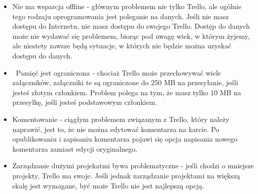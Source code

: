 \documentclass[12pt]{article}
\renewcommand{\_}{\kern-1.5pt\textunderscore\kern-1.5pt}
\begin{document}
\begin{itemize}
	\item Nie ma wsparcja offline - głównym problemem nie tylko Trello, ale ogólnie tego rodzaju oprogramowania jest poleganie na danych. Jeśli nie masz dostępu do Internetu, nie masz dostępu do swojego Trello. Dostęp do danych może nie wydawać się problemem, biorąc pod uwagę wiek, w którym żyjemy, ale niestety zawsze będą sytuacje, w których nie będzie można uzyskać dostępu do danych.\par

	\item  Pamięć jest ograniczona - chociaż Trello może przechowywać wiele załączników, załączniki te są ograniczone do 250 MB na przesyłanie, jeśli jesteś złotym członkiem. Problem polega na tym, że masz tylko 10 MB na przesyłkę, jeśli jesteś podstawowym członkiem.\par

	\item Komentowanie - ciągłym problemem związanym z Trello, który należy naprawić, jest to, że nie można edytować komentarza na karcie. Po opublikowaniu i zapisaniu komentarza pojawi się opcja napisania nowego komentarza zamiast edycji oryginalnego.\par

	\item Zarządzanie dużymi projekatmi bywa problematyczne - jeśli chodzi o mniejsze projekty, Trello ma swoje. Jeśli jednak zarządzanie projektami na większą skalę jest wymagane, być może Trello nie jest najlepszą opcją.
\end{itemize}\par


\vspace{\baselineskip}

\vspace{\baselineskip}

\vspace{\baselineskip}

\printbibliography
\end{document}
